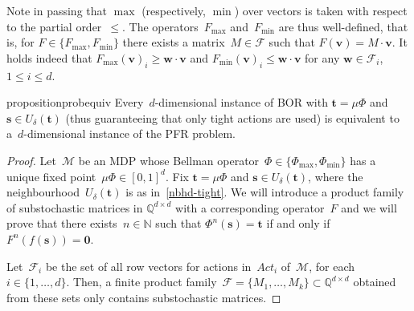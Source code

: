 \documentclass[preprint,12pt]{elsarticle}
\theoremstyle{plain}
\theoremstyle{definition}
\theoremstyle{remark}
\theoremstyle{claimstyle}
\newcommand{\mdp}{\mathcal{M}}
\newcommand{\QQ}{\mathbb{Q}}
\newcommand{\NN}{\mathbb{N}}
\begin{document}
Note in passing that $\max$ (respectively, $\min$) over vectors is taken with respect to the partial order~$\leq$.
The operators~$F_{\max}$ and~$F_{\min}$ are thus well-defined, that is,
for $F \in \{F_{\max}, F_{\min}\}$
there exists a matrix~$M \in \mathcal{F}$ such that $F(\bm{v}) = M\cdot \bm{v}$. 
It holds indeed that $F_{\max}(\bm{v})_i \geq \bm{w} \cdot \bm{v}$ and $F_{\min}(\bm{v})_i \leq \bm{w} \cdot \bm{v}$ for any $\bm{w} \in \mathcal{F}_i$, $1 \leq i \leq d$.
\begin{restatable}{proposition}{probequiv}
\label{probequiv}
Every~$d$-dimensional instance of BOR with $\bm{t} = \mu\Phi$ and $\bm{s} \in U_\delta(\bm{t})$ (thus guaranteeing that only tight actions are used)
is equivalent to a~$d$-dimensional instance of the PFR problem.
\end{restatable}
\begin{proof}
Let~$\mdp$ be an MDP whose Bellman operator~$\Phi \in \{\Phi_{\max}, \Phi_{\min}\}$ has a unique fixed point~$\mu\Phi \in [0,1]^d$.
Fix $\bm{t} = \mu\Phi$ and $\bm{s} \in U_\delta(\bm{t})$, where the neighbourhood~$U_\delta(\bm{t})$ is as in~\cref{nbhd-tight}.
We will introduce a product family of substochastic matrices in $\QQ^{d \times d}$ with a corresponding operator~$F$ and
we will prove that there exists~$n\in \NN$ such that $\Phi^n(\bm{s}) = \bm{t}$
if and only if
$F^n(f(\bm{s})) = \bm{0}$.


Let~$\mathcal{F}_i$ be the set of all row vectors for actions in~$Act_i$ of~$\mdp$, for each $i \in \{1, \dots, d\}$.
Then, a finite product family~$\mathcal{F} = \{M_1, \dots, M_k\} \subset \QQ^{d \times d}$ obtained from these sets only contains substochastic matrices.


\end{proof}
\end{document}
